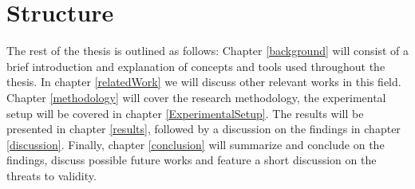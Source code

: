 \section{Structure}
The rest of the thesis is outlined as follows: Chapter \ref{background} will consist of a brief introduction and explanation of concepts and tools used throughout the thesis. In chapter \ref{relatedWork} we will discuss other relevant works in this field.  Chapter \ref{methodology}  will cover the research methodology, the experimental setup will be covered in chapter \ref{ExperimentalSetup}. The results will be presented in chapter \ref{results}, followed by a discussion on the findings in chapter \ref{discussion}. Finally, chapter \ref{conclusion} will summarize and conclude on the findings, discuss possible future works and feature a short discussion on the threats to validity.